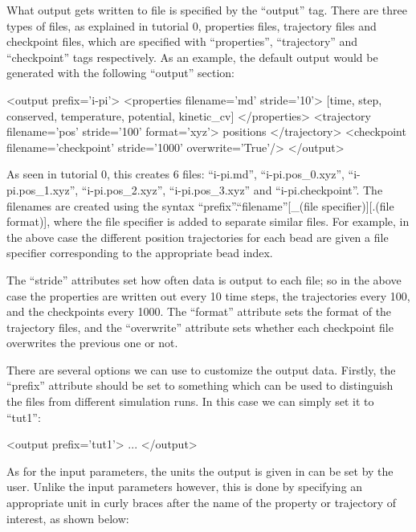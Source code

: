 \documentclass[11pt,english,fleqn]{report}
\newenvironment{code}{%
\footnotesize 
\verbatim
}{
\endverbatim
\normalsize
}
\begin{document}
What output gets written to file is specified by the {}``output'' tag.
There are three types of files, as explained in tutorial 0, 
properties files, trajectory files and checkpoint files, which 
are specified with {}``properties'', {}``trajectory'' 
and {}``checkpoint'' tags respectively.
As an example, the default output would be generated with
the following {}``output'' section:

\begin{code}
<output prefix='i-pi'>
   <properties filename='md' stride='10'>
      [time, step, conserved, temperature, potential, kinetic_cv]
   </properties>
   <trajectory filename='pos' stride='100' format='xyz'>
      positions
   </trajectory>
   <checkpoint filename='checkpoint' stride='1000' overwrite='True'/>
</output>
\end{code}

As seen in tutorial 0, this creates 6 files: {}``i-pi.md'', {}``i-pi.pos\_0.xyz'',
{}``i-pi.pos\_1.xyz'', {}``i-pi.pos\_2.xyz'', {}``i-pi.pos\_3.xyz''
and {}``i-pi.checkpoint''. 
The filenames are created using the syntax 
{}``prefix''.{}``filename''[\_(file specifier)][.(file format)], where the file specifier is
added to separate similar files. For example, in the above case the 
different position trajectories for each bead are given a file specifier
corresponding to the appropriate bead index.

The {}``stride'' attributes set how often data is output to each file;
so in the above case the properties are written out every 10 time steps,
the trajectories every 100, and the checkpoints every 1000.
The {}``format'' attribute sets the format of the trajectory files,
and the {}``overwrite'' attribute sets whether each checkpoint file 
overwrites the previous one or not.

There are several options we can use to customize the
output data. Firstly, the {}``prefix'' attribute should be set to
something which can be used to distinguish the files from different
simulation runs. In this case we can simply set it to {}``tut1'':

\begin{code}
<output prefix='tut1'>
   ...
</output>
\end{code}

As for the input parameters, the units the output is given in can be
set by the user. Unlike the input parameters however, 
this is done by specifying an
appropriate unit in curly braces after the name of the 
property or trajectory of interest, as shown below:
\end{document}
